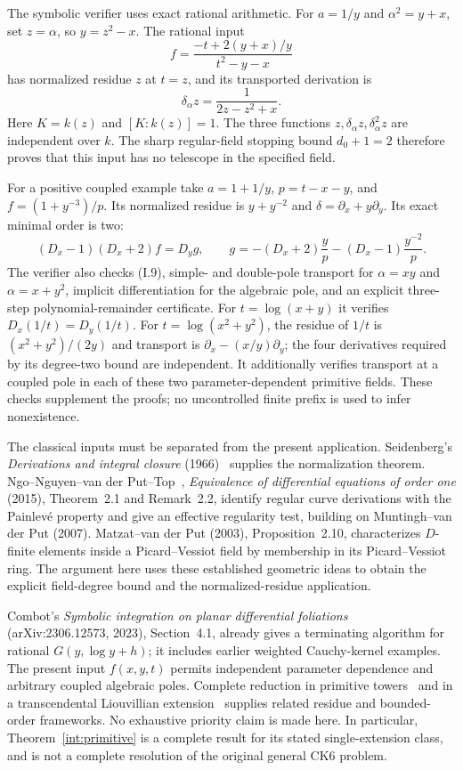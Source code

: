 The symbolic verifier uses exact rational arithmetic.  For $a=1/y$ and
$\alpha^2=y+x$, set $z=\alpha$, so $y=z^2-x$.  The rational input
\[
 f=\frac{-t+2(y+x)/y}{t^2-y-x}
\]
has normalized residue $z$ at $t=z$, and its transported derivation is
\[
             \delta_\alpha z=\frac1{2z-z^2+x}.
\]
Here $K=k(z)$ and $[K:k(z)]=1$.  The three functions
$z,\delta_\alpha z,\delta_\alpha^2z$ are independent over $k$.
The sharp regular-field stopping bound $d_0+1=2$ therefore proves that
this input has no telescope in the specified field.

For a positive coupled example take $a=1+1/y$, $p=t-x-y$, and
$f=(1+y^{-3})/p$.  Its normalized residue is $y+y^{-2}$ and
$\delta=\partial_x+y\partial_y$.  Its exact minimal order is two:
\[
 (D_x-1)(D_x+2)f=D_yg,\qquad
 g=-(D_x+2)\frac y p-(D_x-1)\frac{y^{-2}}p.
\]
The verifier also checks (I.9), simple- and double-pole transport for
$\alpha=xy$ and $\alpha=x+y^2$, implicit differentiation for the
algebraic pole, and an explicit three-step polynomial-remainder
certificate.  For $t=\log(x+y)$ it verifies $D_x(1/t)=D_y(1/t)$.
For $t=\log(x^2+y^2)$, the residue of $1/t$ is
$(x^2+y^2)/(2y)$ and transport is $\partial_x-(x/y)\partial_y$;
the four derivatives required by its degree-two bound are independent.
It additionally verifies transport at a coupled pole in each of these
two parameter-dependent primitive fields.
These checks supplement the proofs; no uncontrolled
finite prefix is used to infer nonexistence.

The classical inputs must be separated from the present application.
Seidenberg's \emph{Derivations and integral closure} (1966)~\cite{Seidenberg1966} supplies the
normalization theorem.  Ngo--Nguyen--van der Put--Top~\cite{Ngo2015},
\emph{Equivalence of differential equations of order one} (2015),
Theorem~2.1 and Remark~2.2, identify regular curve derivations with the
Painlev\'e property and give an effective regularity test, building on
Muntingh--van der Put (2007).  Matzat--van der Put (2003),
Proposition~2.10, characterizes $D$-finite elements inside a
Picard--Vessiot field by membership in its Picard--Vessiot ring.
The argument here uses these established geometric ideas to obtain the
explicit field-degree bound and the normalized-residue application.

Combot's \emph{Symbolic integration on planar differential foliations}~\cite{Combot2023}
(arXiv:2306.12573, 2023), Section~4.1, already gives a terminating
algorithm for rational $G(y,\log y+h)$; it includes earlier weighted
Cauchy-kernel examples.  The present input $f(x,y,t)$ permits independent
parameter dependence and arbitrary coupled algebraic poles.  Complete
reduction in primitive towers~\cite{Du2025} and in a transcendental
Liouvillian extension~\cite{CDG2026} supplies related residue and
bounded-order frameworks.  No exhaustive priority claim is made here.
In particular, Theorem~\ref{int:primitive} is a complete result for its
stated single-extension class, and is not a complete resolution of the
original general CK6 problem.

